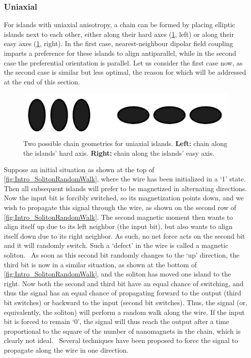\documentclass[11pt,a4paper,english]{article}
\begin{document}
\subsubsection{Uniaxial}
For islands with uniaxial anisotropy, a chain can be formed by placing elliptic islands next to each other, either along their hard axes (\cref{fig:Intro_IslandEllipticChainGeometries}, left) or along their easy axes (\cref{fig:Intro_IslandEllipticChainGeometries}, right). In the first case, nearest-neighbour dipolar field coupling imparts a preference for these islands to align antiparallel, while in the second case the preferential orientation is parallel. Let us consider the first case now, as the second case is similar but less optimal, the reason for which will be addressed at the end of this section.
\begin{figure}
    \centering
    \includegraphics[width=0.6\columnwidth]{Figures/Introduction/Uniaxial_chains.pdf}
    \caption{Two possible chain geometries for uniaxial islands. \textbf{Left:} chain along the islands' hard axis. \textbf{Right:} chain along the islands' easy axis.}
    \label{fig:Intro_IslandEllipticChainGeometries}
\end{figure} \par
Suppose an initial situation as shown at the top of \cref{fig:Intro_SolitonRandomWalk}, where the wire has been initialized in a `1' state. Then all subsequent islands will prefer to be magnetized in alternating directions. Now the input bit is forcibly switched, so its magnetization points down, and we wish to propagate this signal through the wire, as shown on the second row of \cref{fig:Intro_SolitonRandomWalk}. The second magnetic moment then wants to align itself up due to its left neighbor (the input bit), but also wants to align itself down due to its right neighbor. As such, no net force acts on the second bit and it will randomly switch. Such a `defect' in the wire is called a magnetic soliton.~\cite{MQCA_RoomTemp} As soon as this second bit randomly changes to the `up' direction, the third bit is now in a similar situation, as shown at the bottom of \cref{fig:Intro_SolitonRandomWalk}, and the soliton has moved one island to the right. Now both the second and third bit have an equal chance of switching, and thus the signal has an equal chance of propagating forward to the output (third bit switches) or backward to the input (second bit switches). Thus, the signal (or, equivalently, the soliton) will perform a random walk along the wire. If the input bit is forced to remain `0', the signal will thus reach the output after a time proportional to the square of the number of nanomagnets in the chain, which is clearly not ideal.~\cite{Wolfram_RandomWalk} Several techniques have been proposed to force the signal to propagate along the wire in one direction.
\end{document}
